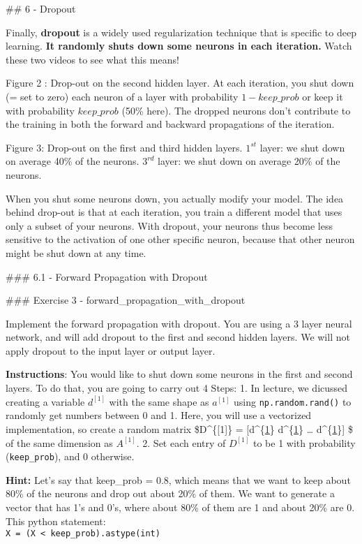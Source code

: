 \documentclass[11pt]{article}
\begin{document}
    \#\# 6 - Dropout

Finally, \textbf{dropout} is a widely used regularization technique that
is specific to deep learning. \textbf{It randomly shuts down some
neurons in each iteration.} Watch these two videos to see what this
means!

Figure 2 : Drop-out on the second hidden layer. At each iteration, you
shut down (= set to zero) each neuron of a layer with probability
\(1 - keep\_prob\) or keep it with probability \(keep\_prob\) (50\%
here). The dropped neurons don't contribute to the training in both the
forward and backward propagations of the iteration.

Figure 3: Drop-out on the first and third hidden layers. \(1^{st}\)
layer: we shut down on average 40\% of the neurons. \(3^{rd}\) layer: we
shut down on average 20\% of the neurons.

When you shut some neurons down, you actually modify your model. The
idea behind drop-out is that at each iteration, you train a different
model that uses only a subset of your neurons. With dropout, your
neurons thus become less sensitive to the activation of one other
specific neuron, because that other neuron might be shut down at any
time.

\#\#\# 6.1 - Forward Propagation with Dropout

\#\#\# Exercise 3 - forward\_propagation\_with\_dropout

Implement the forward propagation with dropout. You are using a 3 layer
neural network, and will add dropout to the first and second hidden
layers. We will not apply dropout to the input layer or output layer.

\textbf{Instructions}: You would like to shut down some neurons in the
first and second layers. To do that, you are going to carry out 4 Steps:
1. In lecture, we dicussed creating a variable \(d^{[1]}\) with the same
shape as \(a^{[1]}\) using \texttt{np.random.rand()} to randomly get
numbers between 0 and 1. Here, you will use a vectorized implementation,
so create a random matrix \$D\^{}\{{[}1{]}\} = {[}d\^{}\{\url{1}\}
d\^{}\{\href{2}{1}\} \ldots{} d\^{}\{\href{m}{1}\}{]} \$ of the same
dimension as \(A^{[1]}\). 2. Set each entry of \(D^{[1]}\) to be 1 with
probability (\texttt{keep\_prob}), and 0 otherwise.

\textbf{Hint:} Let's say that keep\_prob = 0.8, which means that we want
to keep about 80\% of the neurons and drop out about 20\% of them. We
want to generate a vector that has 1's and 0's, where about 80\% of them
are 1 and about 20\% are 0. This python statement:\\
\texttt{X\ =\ (X\ \textless{}\ keep\_prob).astype(int)}
\end{document}
